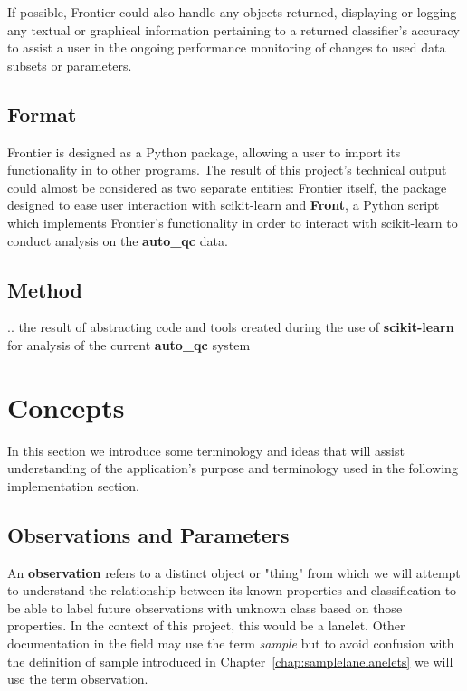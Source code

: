 If possible, Frontier could also handle any objects returned, displaying or
logging any textual or graphical information pertaining to a returned
classifier's accuracy to assist a user in the ongoing performance monitoring of
changes to used data subsets or parameters.


\subsection{Format}

Frontier is designed as a Python package, allowing a user to import its
functionality in to other programs. The result of this project's technical
output could almost be considered as two separate entities: Frontier itself, the
package designed to ease user interaction with scikit-learn and \textbf{Front},
a Python script which implements Frontier's functionality in order to interact
with scikit-learn to conduct analysis on the \textbf{auto\_qc} data.


\subsection{Method}

.. the result of abstracting code and tools created during the use of
\textbf{scikit-learn} for analysis of the current \textbf{auto\_qc} system


\section{Concepts}

In this section we introduce some terminology and ideas that will assist
understanding of the application's purpose and terminology used in the following
implementation section.


\subsection{Observations and Parameters}

An \textbf{observation} refers to a distinct object or "thing" from which we
will attempt to understand the relationship between its known properties and
classification to be able to label future observations with unknown class based
on those properties. In the context of this project, this would be a lanelet.
Other documentation in the field may use the term \textit{sample} but to avoid
confusion with the definition of sample introduced in
Chapter~\ref{chap:samplelanelanelets} we will use the term observation.

